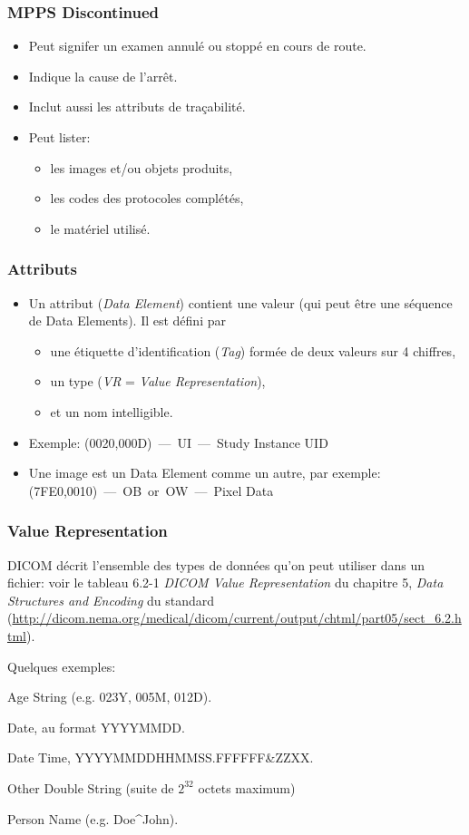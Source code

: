	\frame
	{
		\frametitle{MPPS Discontinued}
		\begin{itemize}
			\item Peut signifer un examen annul\'e ou stopp\'e en cours de route.
			\item<2-> Indique la cause de l'arr\^et.
			\item<3-> Inclut aussi les attributs de tra\c cabilit\'e.
			\item<4-> Peut lister:
			\begin{itemize}
				\item<5-> les images et/ou objets produits,
				\item<6-> les codes des protocoles compl\'et\'es,
				\item<7-> le mat\'eriel utilis\'e.
			\end{itemize}			
		\end{itemize}
	}
	
	\frame
	{
		\frametitle{Attributs}
		\begin{itemize}
			\item Un attribut (\emph{Data Element}) contient une valeur (qui peut \^etre une s\'equence de Data Elements).
			Il est d\'efini par
			\begin{itemize}
				\item<2-> une \'etiquette d'identification (\emph{Tag}) form\'ee de deux valeurs sur 4 chiffres,
				\item<3-> un type (\emph{VR} = \emph{Value Representation}),
				\item<4-> et un nom intelligible.
			\end{itemize}
		
			\item<5-> Exemple: (0020,000D)~---~UI~---~Study Instance UID
			\item<6-> Une image est un Data Element comme un autre, par exemple: (7FE0,0010)~---~OB~or~OW~---~Pixel Data
		\end{itemize}
	}
		
	\frame
	{
		\frametitle{Value Representation}
		DICOM d\'ecrit l'ensemble des types de donn\'ees qu'on peut utiliser dans un fichier: voir le tableau 6.2{-}1 \emph{DICOM Value Representation} du chapitre 5, \emph{Data Structures and Encoding} du standard (\url{http://dicom.nema.org/medical/dicom/current/output/chtml/part05/sect_6.2.html}).
		
		Quelques exemples:
    	\begin{description}
            \item<2->[AS] Age String (e.g. 023Y, 005M, 012D).
            \item<3->[DA] Date, au format YYYYMMDD.
            \item<4->[DT] Date Time, YYYYMMDDHHMMSS.FFFFFF\&{}ZZXX.
            \item<5->[OD] Other Double String (suite de $2^{32}$ octets maximum)
            \item<6->[PN] Person Name (e.g. Doe\^{}John).
		\end{description}
	}

